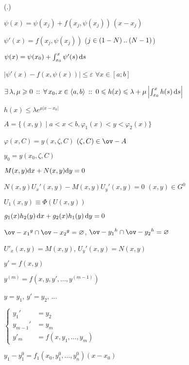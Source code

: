 \documentclass[hardcopy]{longnotes}
\begin{document}
\begin{list}
{(\thechn.\theeqn)}
{
  \setlength{\labelwidth}{2cm}
  \setlength{\labelsep}{1em}
  \renewcommand{\makelabel}[1]{#1 \usebox{\smtri}}
}

\skeq[4]
  \item $\psi (x) = \psi(x_j) + f(x_j, \psi(x_j))\, (x-x_j)$
  \item $\psi'(x) = f(x_j, \psi(x_j))$ 
    \hfill ($j\in (1-N) \mathbin{..} (N-1)$)
  \item $\psi (x) = \psi(x_0) + \int_{x_0}^x \psi'(s) \, \mathrm{d} s$
  \item $|\psi'(x) - f(x,\psi(x))| \leqslant \varepsilon$
    \hfill $\forall x\in [a;b]$
\skeq
  \item $\exists\, \lambda, \mu \geqslant 0 \:::\: 
    \forall\, x_0 , x\in \langle a,b \rangle \:::\: 
    0 \leqslant h(x) \leqslant\lambda+
    \mu \left|\int_{x_0}^x h(s) \,\mathrm{d} s \right|$
  \item $h(x) \leqslant \lambda e^{\mu |x-x_0|}$
\skeq
  \item $A = \{(x,y) \mid a<x<b, \varphi_1(x) <y<\varphi_2(x)\}$
  \item $\varphi(x,C) = y(x,\zeta, C)$
    \hfill $(\zeta,C) \in \ov-{A}$
  \item $y_0 = y(x_0, \zeta, C)$
\nch
  \item $M(x,y)\mathrm{d} x + N(x,y)\mathrm{d} y =0$
    \skeq[7]
  \item $N(x,y)U_x'(x,y) - M(x,y)U_y'(x,y)=0$ \hfill $(x,y) \in G^0$
  \item $U_1(x,y) \equiv \Phi(U(x,y))$
  \item $g_1(x)h_2(y) \, \mathrm{d} x+ g_2(x) h_1(y) \, \mathrm{d} y =0 $
  \item $\ov-{x_1}^g \cap \ov-{x_2}^g = \varnothing$, $\ov-{y_1}^h \cap \ov-{y_2}^h = \varnothing$
\skeq[4]
  \item $U'_x(x,y) = M(x,y)$, $U_y'(x,y) = N(x,y)$
\nch
  \item $y'=f(x,y)$
  \item $y^{(m)} = f(x,y,y', \dotsc, y^{(m-1)})$
  \item $y=y_1$, $y'=y_2$, ...
  \item 
    $ \left\{
    \begin{aligned}
      y_1' &= y_2 \\
      y_{m-1}' &= y_m \\
      y'_m &= f(x,y_1, \dotsc, y_m)
    \end{aligned} \right.
    $
  \item $y_1  - y_1^0 = f_1(x_0,y_1^0, \dotsc, y_n^0)(x-x_0)$

\end{list}
\end{document}
